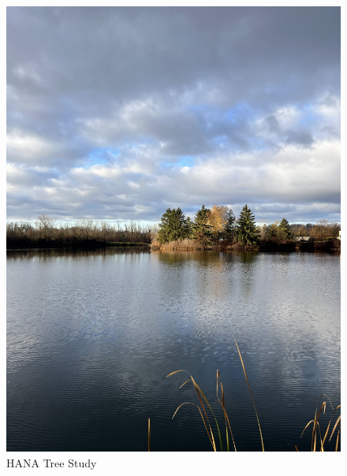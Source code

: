 \documentclass{article}
\begin{document}
\begin{figure}[h!]
\centering
\includegraphics[scale=.1]{Research/HANA/NOV2024/IMG_9834.JPG}
\caption{HANA Tree Study}
\label{fig:HANA}
\end{figure}
\end{document}
